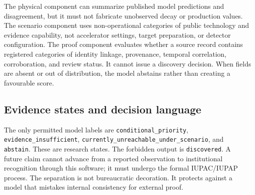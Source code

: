 \documentclass[conference]{IEEEtran}
\begin{document}
The physical component can summarize published model predictions and disagreement, but it must not fabricate unobserved decay or production values. The scenario component uses non-operational categories of public technology and evidence capability, not accelerator settings, target preparation, or detector configuration. The proof component evaluates whether a source record contains registered categories of identity linkage, provenance, temporal correlation, corroboration, and review status. It cannot issue a discovery decision. When fields are absent or out of distribution, the model abstains rather than creating a favourable score.

\subsection{Evidence states and decision language}

The only permitted model labels are \texttt{conditional\_priority}, \texttt{evidence\_insufficient}, \texttt{currently\_unreachable\_under\_scenario}, and \texttt{abstain}. These are research states. The forbidden output is \texttt{discovered}. A future claim cannot advance from a reported observation to institutional recognition through this software; it must undergo the formal IUPAC/IUPAP process. The separation is not bureaucratic decoration. It protects against a model that mistakes internal consistency for external proof.
\end{document}
